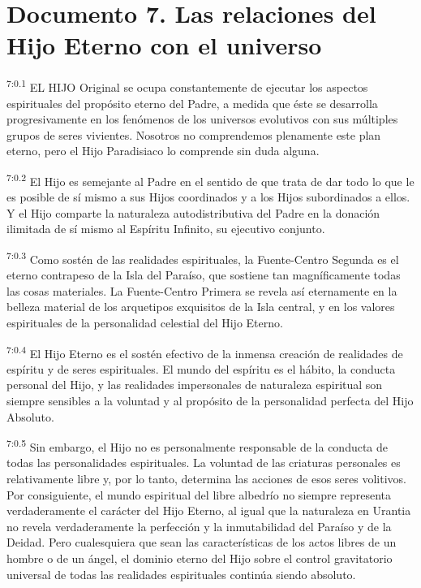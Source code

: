 \chapter{Documento 7. Las relaciones del Hijo Eterno con el universo}
\par
\textsuperscript{7:0.1} EL HIJO Original se ocupa constantemente de ejecutar los aspectos espirituales del propósito eterno del Padre, a medida que éste se desarrolla progresivamente en los fenómenos de los universos evolutivos con sus múltiples grupos de seres vivientes. Nosotros no comprendemos plenamente este plan eterno, pero el Hijo Paradisiaco lo comprende sin duda alguna.

\par
\textsuperscript{7:0.2} El Hijo es semejante al Padre en el sentido de que trata de dar todo lo que le es posible de sí mismo a sus Hijos coordinados y a los Hijos subordinados a ellos. Y el Hijo comparte la naturaleza autodistributiva del Padre en la donación ilimitada de sí mismo al Espíritu Infinito, su ejecutivo conjunto.

\par
\textsuperscript{7:0.3} Como sostén de las realidades espirituales, la Fuente-Centro Segunda es el eterno contrapeso de la Isla del Paraíso, que sostiene tan magníficamente todas las cosas materiales. La Fuente-Centro Primera se revela así eternamente en la belleza material de los arquetipos exquisitos de la Isla central, y en los valores espirituales de la personalidad celestial del Hijo Eterno.

\par
\textsuperscript{7:0.4} El Hijo Eterno es el sostén efectivo de la inmensa creación de realidades de espíritu y de seres espirituales. El mundo del espíritu es el hábito, la conducta personal del Hijo, y las realidades impersonales de naturaleza espiritual son siempre sensibles a la voluntad y al propósito de la personalidad perfecta del Hijo Absoluto.

\par
\textsuperscript{7:0.5} Sin embargo, el Hijo no es personalmente responsable de la conducta de todas las personalidades espirituales. La voluntad de las criaturas personales es relativamente libre y, por lo tanto, determina las acciones de esos seres volitivos. Por consiguiente, el mundo espiritual del libre albedrío no siempre representa verdaderamente el carácter del Hijo Eterno, al igual que la naturaleza en Urantia no revela verdaderamente la perfección y la inmutabilidad del Paraíso y de la Deidad. Pero cualesquiera que sean las características de los actos libres de un hombre o de un ángel, el dominio eterno del Hijo sobre el control gravitatorio universal de todas las realidades espirituales continúa siendo absoluto.

